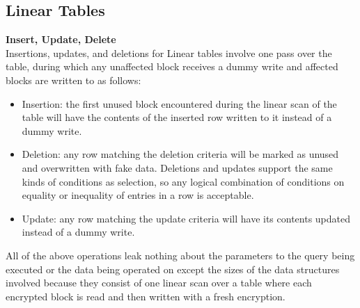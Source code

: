 \documentclass[USenglish,oneside,twocolumn]{article}
\begin{document}
\subsection{Linear Tables}
\medskip \noindent \textbf{Insert, Update, Delete}\\
Insertions, updates, and deletions for Linear tables involve one pass over the table, during which any unaffected block receives a dummy write and affected blocks are written to as follows:
\begin{itemize}
\item Insertion: the first unused block encountered during the linear scan of the table will have the contents of the inserted row written to it instead of a dummy write.
\item Deletion: any row matching the deletion criteria will be marked as unused and overwritten with fake data. Deletions and updates support the same kinds of conditions as selection, so any logical combination of conditions on equality or inequality of entries in a row is acceptable. 
\item Update: any row matching the update criteria will have its contents updated instead of a dummy write. 
\end{itemize}

All of the above operations leak nothing about the parameters to the query being executed or the data being operated on except the sizes of the data structures involved because they consist of one linear scan over a table where each encrypted block is read and then written with a fresh encryption. 
\end{document}
